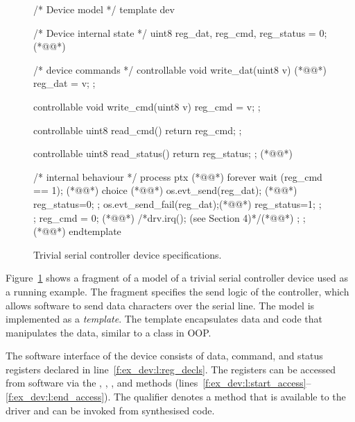 \begin{figure}
\begin{tsllisting}[name=ex]
/* Device model */
template dev 

    /* Device internal state */
    uint8 reg_dat, reg_cmd, reg_status = 0; (*@\label{f:ex_dev:l:reg_decls}@*)

    /* device commands */
    controllable void write_dat(uint8 v) { (*@\label{f:ex_dev:l:start_access}@*)
        reg_dat = v; 
    };

    controllable void write_cmd(uint8 v) { 
        reg_cmd = v; 
    };

    controllable uint8 read_cmd() { 
        return reg_cmd; 
    };

    controllable uint8 read_status() { 
        return reg_status; 
    }; (*@\label{f:ex_dev:l:end_access}@*)

    /* internal behaviour */
    process ptx { (*@\label{f:ex_dev:l:start_xmit}@*)
        forever {
            wait (reg_cmd == 1); (*@\label{f:ex_dev:l:wait}@*)
            choice {(*@\label{f:ex_dev:l:atomic_start}@*)
                { 
                    os.evt_send(reg_dat); (*@\label{f:ex_dev:l:cb_succ}@*)
                    reg_status=0; 
                };
                { 
                    os.evt_send_fail(reg_dat);(*@\label{f:ex_dev:l:cb_fail}@*)
                    reg_status=1; 
                };
            };
            reg_cmd = 0; (*@\label{f:ex_dev:l:atomic_end}@*)
            /*drv.irq(); (see Section 4)*/(*@\label{f:ex_dev:l:irq}@*)
        };
    }; (*@\label{f:ex_dev:l:end_xmit}@*)
endtemplate
\end{tsllisting}
\caption{Trivial serial controller device specifications.}
\label{f:ex_dev}
\end{figure}

Figure~\ref{f:ex_dev} shows a fragment of a model of a trivial serial controller device used as a running example.  The fragment specifies the send logic of the controller, which allows software to send data characters over the serial line.  The model is implemented as a \tsl \emph{template}.  The template encapsulates data and code that manipulates the data, similar to a class in OOP.

The software interface of the device consists of data, command, and status registers declared in line~\ref{f:ex_dev:l:reg_decls}.  The registers can be accessed from software via the , , , and  methods (lines~\ref{f:ex_dev:l:start_access}--\ref{f:ex_dev:l:end_access}).  The  qualifier denotes a method that is available to the driver and can be invoked from synthesised code.


